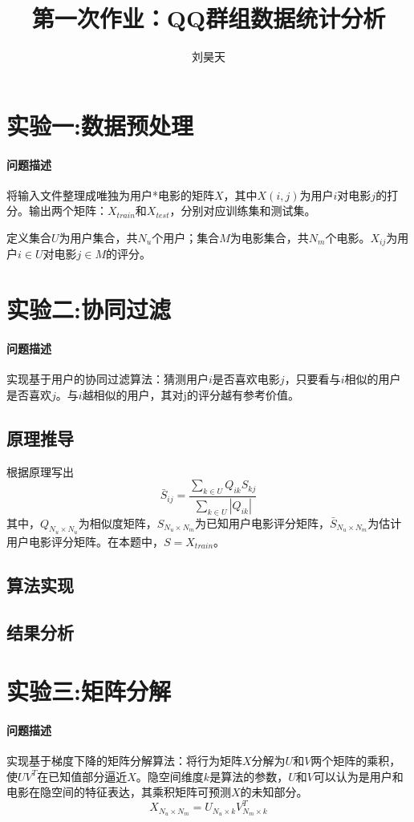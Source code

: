 \documentclass[a4paper,12pt]{article}
\title{第一次作业：QQ群组数据统计分析}
\author{刘昊天}
\begin{document}
    \maketitle
    \section{实验一:数据预处理}
    \paragraph{问题描述}
    将输入文件整理成唯独为用户*电影的矩阵$X$，其中$X(i,j)$为用户$i$对电影$j$的打分。输出两个矩阵：$X_{train}$和$X_{test}$，分别对应训练集和测试集。

    定义集合$U$为用户集合，共$N_u$个用户；集合$M$为电影集合，共$N_m$个电影。$X_{ij}$为用户$i\in U$对电影$j\in M$的评分。

    \section{实验二:协同过滤}
    \paragraph{问题描述}
    实现基于用户的协同过滤算法：猜测用户$i$是否喜欢电影$j$，只要看与$i$相似的用户是否喜欢$j$。与$i$越相似的用户，其对j的评分越有参考价值。
    \subsection{原理推导}
    根据原理写出
    $$
      \bar S_{ij} = \frac{\sum_{k\in U} Q_{ik}S_{kj}}{\sum_{k\in U} |Q_{ik}|}
    $$
    其中，$Q_{N_u\times N_u}$为相似度矩阵，$S_{N_u\times N_m}$为已知用户电影评分矩阵，$\bar S_{N_u\times N_m}$为估计用户电影评分矩阵。在本题中，$S=X_{train}$。

    \subsection{算法实现}

    \subsection{结果分析}

    \section{实验三:矩阵分解}
    \paragraph{问题描述}
    实现基于梯度下降的矩阵分解算法：将行为矩阵$X$分解为$U$和$V$两个矩阵的乘积，使$UV^T$在已知值部分逼近$X$。隐空间维度$k$是算法的参数，$U$和$V$可以认为是用户和电影在隐空间的特征表达，其乘积矩阵可预测$X$的未知部分。
    $$
      X_{N_u\times N_m} = U_{N_u\times k}V_{N_m\times k}^T
    $$
\end{document}
